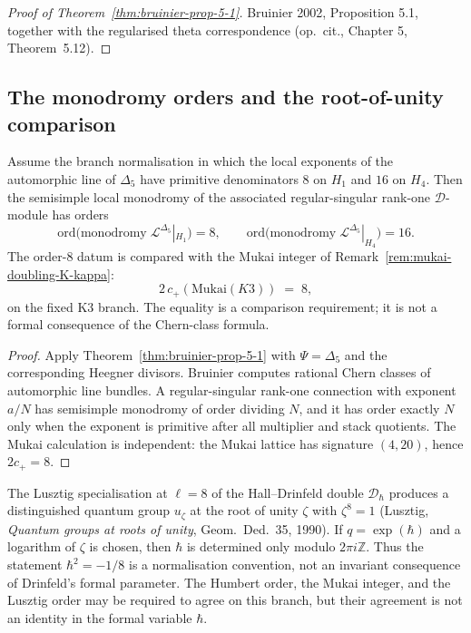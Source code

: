 \begin{proof}[Proof of Theorem~\ref{thm:bruinier-prop-5-1}]
Bruinier 2002, Proposition 5.1, together with the regularised theta correspondence (op.~cit., Chapter 5, Theorem~5.12).
\end{proof}

\subsection{The monodromy orders and the root-of-unity comparison}

\begin{theorem}
\label{thm:humbert-order-K-kappa}
Assume the branch normalisation in which the local exponents of the automorphic line of $\Delta_5$ have primitive denominators $8$ on $H_1$ and $16$ on $H_4$. Then the semisimple local monodromy of the associated regular-singular rank-one $\mathcal{D}$-module has orders
\[
 \mathrm{ord}\bigl(\mathrm{monodromy}\; \mathcal{L}^{\Delta_5}|_{H_1}\bigr) = 8,
 \qquad
 \mathrm{ord}\bigl(\mathrm{monodromy}\; \mathcal{L}^{\Delta_5}|_{H_4}\bigr) = 16.
\]
The order-$8$ datum is compared with the Mukai integer of Remark~\ref{rem:mukai-doubling-K-kappa}:
\[
 2\,c_+(\mathrm{Mukai}(K3))
 \;=\;
 8,
\]
on the fixed K3 branch. The equality is a comparison requirement; it is not a formal consequence of the Chern-class formula.
\end{theorem}

\begin{proof}
Apply Theorem~\ref{thm:bruinier-prop-5-1} with $\Psi=\Delta_5$ and the corresponding Heegner divisors. Bruinier computes rational Chern classes of automorphic line bundles. A regular-singular rank-one connection with exponent $a/N$ has semisimple monodromy of order dividing $N$, and it has order exactly $N$ only when the exponent is primitive after all multiplier and stack quotients. The Mukai calculation is independent: the Mukai lattice has signature $(4,20)$, hence $2c_+=8$.
\end{proof}

\begin{remark}
\label{rem:hbar-minus-eighth}
The Lusztig specialisation at $\ell = 8$ of the Hall--Drinfeld double $\mathcal{D}_\hbar$
produces a distinguished quantum group $u_\zeta$ at the root of unity $\zeta$ with
$\zeta^8 = 1$ (Lusztig, \emph{Quantum groups at roots of unity}, Geom.~Ded.~35, 1990). If $q=\exp(\hbar)$ and a logarithm of $\zeta$ is chosen, then $\hbar$ is determined only modulo $2\pi i\mathbb{Z}$. Thus the statement $\hbar^2=-1/8$ is a normalisation convention, not an invariant consequence of Drinfeld's formal parameter. The Humbert order, the Mukai integer, and the Lusztig order may be required to agree on this branch, but their agreement is not an identity in the formal variable $\hbar$.
\end{remark}

